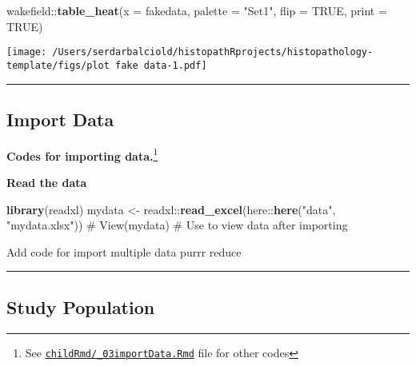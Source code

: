 \documentclass[
]{article}
\newenvironment{Shaded}{\begin{snugshade}}{\end{snugshade}}
\newcommand{\CommentTok}[1]{\textcolor[rgb]{0.54,0.53,0.53}{#1}}
\newcommand{\DataTypeTok}[1]{\textcolor[rgb]{0.00,0.34,0.68}{#1}}
\newcommand{\KeywordTok}[1]{\textcolor[rgb]{0.12,0.11,0.11}{\textbf{#1}}}
\newcommand{\NormalTok}[1]{\textcolor[rgb]{0.12,0.11,0.11}{#1}}
\newcommand{\OperatorTok}[1]{\textcolor[rgb]{0.12,0.11,0.11}{#1}}
\newcommand{\OtherTok}[1]{\textcolor[rgb]{0.00,0.43,0.16}{#1}}
\newcommand{\StringTok}[1]{\textcolor[rgb]{0.75,0.01,0.01}{#1}}
\begin{document}
\begin{Shaded}
\begin{Highlighting}[]
\NormalTok{wakefield}\OperatorTok{::}\KeywordTok{table_heat}\NormalTok{(}\DataTypeTok{x =}\NormalTok{ fakedata, }\DataTypeTok{palette =} \StringTok{"Set1"}\NormalTok{, }\DataTypeTok{flip =} \OtherTok{TRUE}\NormalTok{, }\DataTypeTok{print =} \OtherTok{TRUE}\NormalTok{)}
\end{Highlighting}
\end{Shaded}

\texttt{[image: /Users/serdarbalciold/histopathRprojects/histopathology-template/figs/plot fake data-1.pdf]}

\begin{center}\rule{0.5\linewidth}{0.5pt}\end{center}

\hypertarget{import-data}{%
\subsection{Import Data}\label{import-data}}

\textbf{Codes for importing data.}\footnote{See
  \href{https://github.com/sbalci/histopathology-template/blob/master/childRmd/_03importData.Rmd}{\texttt{childRmd/\_03importData.Rmd}}
  file for other codes}

\textbf{Read the data}

\begin{Shaded}
\begin{Highlighting}[]
\KeywordTok{library}\NormalTok{(readxl)}
\NormalTok{mydata <-}\StringTok{ }\NormalTok{readxl}\OperatorTok{::}\KeywordTok{read_excel}\NormalTok{(here}\OperatorTok{::}\KeywordTok{here}\NormalTok{(}\StringTok{"data"}\NormalTok{, }\StringTok{"mydata.xlsx"}\NormalTok{))}
\CommentTok{# View(mydata) # Use to view data after importing}
\end{Highlighting}
\end{Shaded}

Add code for import multiple data purrr reduce

\begin{center}\rule{0.5\linewidth}{0.5pt}\end{center}

\hypertarget{study-population}{%
\subsection{Study Population}\label{study-population}}
\end{document}

